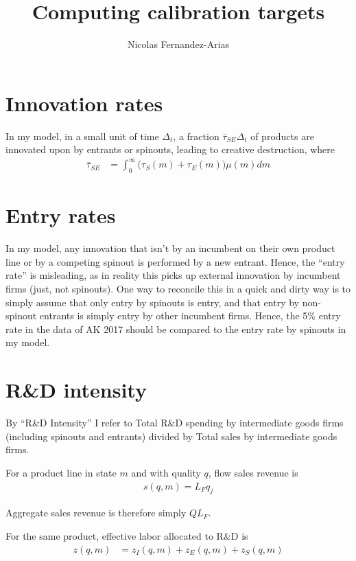 \documentclass[12pt,english]{article}
\theoremstyle{remark}
\begin{document}
	
\title{Computing calibration targets}
\author{Nicolas Fernandez-Arias}
\maketitle

\section{Innovation rates}

In my model, in a small unit of time $\Delta_t$, a fraction $\bar{\tau}_{SE} \Delta_t$ of products are innovated upon by entrants or spinouts, leading to creative destruction, where 
\begin{align*}
	\bar{\tau}_{SE} &= \int_0^{\infty} \big (\tau_S(m) + \tau_E(m) \big) \mu(m) dm
\end{align*}

\section{Entry rates}

In my model, any innovation that isn't by an incumbent on their own product line or by a competing spinout is performed by a new entrant. Hence, the ``entry rate'' is misleading, as in reality this picks up external innovation by incumbent firms (just, not spinouts). One way to reconcile this in a quick and dirty way is to simply assume that only entry by spinouts is entry, and that entry by non-spinout entrants is simply entry by other incumbent firms. Hence, the 5\% entry rate in the data of AK 2017 should be compared to the entry rate by spinouts in my model. 

\section{R\&D intensity}

By ``R\&D Intensity'' I refer to Total R\&D spending by intermediate goods firms (including spinouts and entrants) divided by Total sales by intermediate goods firms. 

For a product line in state $m$ and with quality $q$, flow sales revenue is 
\begin{align*}
	s(q,m) = L_F q_j 
\end{align*}

Aggregate sales revenue is therefore simply $Q L_F$. 

For the same product, effective labor allocated to R\&D is
\begin{align*}
	z(q,m) &= z_I(q,m) + z_E(q,m) + z_S(q,m)
\end{align*}
\end{document}
